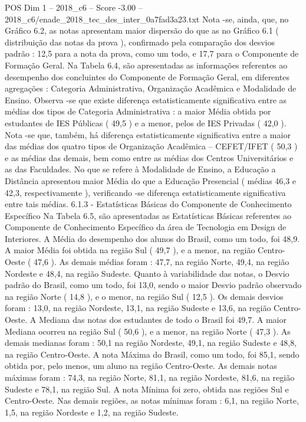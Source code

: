 \begin{textsample}{POS Dim 1 – 2018\_c6 – Score -3.00 – 2018\_c6/enade\_2018\_tec\_des\_inter\_0a7fad3a23.txt}
Nota -se, ainda, que, no Gráfico 6.2, as notas apresentam maior dispersão do que as no Gráfico 6.1 ( distribuição das notas da prova ), confirmado pela comparação dos desvios padrão : 12,5 para a nota da prova, como um todo, e 17,7 para o Componente de Formação Geral.
Na Tabela 6.4, são apresentadas as informações referentes ao desempenho dos concluintes do Componente de Formação Geral, em diferentes agregações : Categoria Administrativa, Organização Acadêmica e Modalidade de Ensino.
Observa -se que existe diferença estatisticamente significativa entre as médias dos tipos de Categoria Administrativa : a maior Média obtida por estudantes de IES Públicas ( 49,5 ) e a menor, pelos de IES Privadas ( 42,0 ).
Nota -se que, também, há diferença estatisticamente significativa entre a maior das médias dos quatro tipos de Organização Acadêmica – CEFET/IFET ( 50,3 ) e as médias das demais, bem como entre as médias dos Centros Universitários e as das Faculdades.
No que se refere à Modalidade de Ensino, a Educação a Distância apresentou maior Média do que a Educação Presencial ( médias 46,3 e 42,3, respectivamente ), verificando -se diferença estatisticamente significativa entre tais médias. 6.1.3 - Estatísticas Básicas do Componente de Conhecimento Específico Na Tabela 6.5, são apresentadas as Estatísticas Básicas referentes ao Componente de Conhecimento Específico da área de Tecnologia em Design de Interiores.
A Média do desempenho dos alunos do Brasil, como um todo, foi 48,9.
A maior Média foi obtida na região Sul ( 49,7 ), e a menor, na região Centro-Oeste ( 47,6 ).
As demais médias foram : 47,7, na região Norte, 49,4, na região Nordeste e 48,4, na região Sudeste.
Quanto à variabilidade das notas, o Desvio padrão do Brasil, como um todo, foi 13,0, sendo o maior Desvio padrão observado na região Norte ( 14,8 ), e o menor, na região Sul ( 12,5 ).
Os demais desvios foram : 13,0, na região Nordeste, 13,1, na região Sudeste e 13,6, na região Centro-Oeste.
A Mediana das notas dos estudantes de todo o Brasil foi 49,7.
A maior Mediana ocorreu na região Sul ( 50,6 ), e a menor, na região Norte ( 47,3 ).
As demais medianas foram : 50,1 na região Nordeste, 49,1, na região Sudeste e 48,8, na região Centro-Oeste.
A nota Máxima do Brasil, como um todo, foi 85,1, sendo obtida por, pelo menos, um aluno na região Centro-Oeste.
As demais notas máximas foram : 74,3, na região Norte, 81,1, na região Nordeste, 81,6, na região Sudeste e 78,1, na região Sul.
A nota Mínima foi zero, obtida nas regiões Sul e Centro-Oeste.
Nas demais regiões, as notas mínimas foram : 6,1, na região Norte, 1,5, na região Nordeste e 1,2, na região Sudeste.

\end{textsample}
